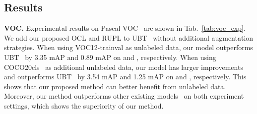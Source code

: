 \documentclass{bmvc2k}
\begin{document}
\subsection{Results}
\noindent \textbf{VOC. }
Experimental results on Pascal VOC~\cite{voc} are shown in Tab.~\ref{tab:voc_exp}. We add our proposed OCL and RUPL to UBT~\cite{liu2021unbiased} without additional augmentation strategies. When using VOC12-trainval as unlabeled data, our model outperforms UBT~\cite{liu2021unbiased} by 3.35 mAP and 0.89 mAP on  and , respectively. When using COCO20cls~\cite{liu2021unbiased} as additional unlabeled data, our model has larger improvements and outperforms UBT~\cite{liu2021unbiased} by 3.54 mAP and 1.25 mAP on  and , respectively. This shows that our proposed method can better benefit from unlabeled data.
Moreover, our method outperforms other existing models~\cite{STAC,combatnoise,instant_teaching,humbleteacher,adaptiveclass,rethink,zheng2022dual,MUM,globalclassprototypes,ubteacherv2,scale-equivalent} on both experiment settings, which shows the superiority of our method. 
\end{document}
